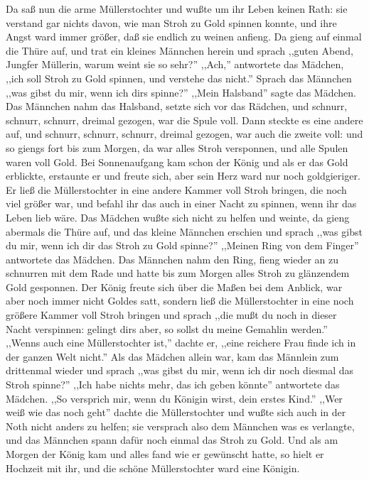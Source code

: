 \documentclass[10pt,a4paper]{article}
\begin{document}
\vskip 4pt
Da saß nun die arme Müllerstochter und wußte um ihr Leben keinen Rath: sie
verstand gar nichts davon, wie man Stroh zu Gold spinnen konnte, und ihre Angst
ward immer größer, daß sie endlich zu weinen anfieng. Da gieng auf einmal die
Thüre auf, und trat ein kleines Männchen herein und sprach ,,guten Abend,
Jungfer Müllerin, warum weint sie so sehr?'' ,,Ach,'' antwortete das Mädchen,
,,ich soll Stroh zu Gold spinnen, und verstehe das nicht.'' Sprach das Männchen
,,was gibst du mir, wenn ich dirs spinne?'' ,,Mein Halsband'' sagte das Mädchen.
Das Männchen nahm das Halsband, setzte sich vor das Rädchen, und schnurr,
schnurr, schnurr, dreimal gezogen, war die Spule voll. Dann steckte es eine
andere auf, und schnurr, schnurr, schnurr, dreimal gezogen, war auch die zweite
voll: und so giengs fort bis zum Morgen, da war alles Stroh versponnen, und alle
Spulen waren voll Gold. Bei Sonnenaufgang kam schon der König und als er das
Gold erblickte, erstaunte er und freute sich, aber sein Herz ward nur noch
goldgieriger. Er ließ die Müllerstochter in eine andere Kammer voll Stroh
bringen, die noch viel größer war, und befahl ihr das auch in einer Nacht zu
spinnen, wenn ihr das Leben lieb wäre. Das Mädchen wußte sich nicht zu helfen
und weinte, da gieng abermals die Thüre auf, und das kleine Männchen erschien
und sprach ,,was gibst du mir, wenn ich dir das Stroh zu Gold spinne?'' ,,Meinen
Ring von dem Finger'' antwortete das Mädchen. Das Männchen nahm den Ring, fieng
wieder an zu schnurren mit dem Rade und hatte bis zum Morgen alles Stroh zu
glänzendem Gold gesponnen. Der König freute sich über die Maßen bei dem Anblick,
war aber noch immer nicht Goldes satt, sondern ließ die Müllerstochter in eine
noch größere Kammer voll Stroh bringen und sprach ,,die mußt du noch in dieser
Nacht verspinnen: gelingt dirs aber, so sollst du meine Gemahlin werden.''
,,Wenns auch eine Müllerstochter ist,'' dachte er, ,,eine reichere Frau finde
ich in der ganzen Welt nicht.'' Als das Mädchen allein war, kam das Männlein
zum drittenmal wieder und sprach ,,was gibst du mir, wenn ich dir noch diesmal
das Stroh spinne?'' ,,Ich habe nichts mehr, das ich geben könnte'' antwortete
das Mädchen. ,,So versprich mir, wenn du Königin wirst, dein erstes Kind.''
,,Wer weiß wie das noch geht'' dachte die Müllerstochter und wußte sich auch in
der Noth nicht anders zu helfen; sie versprach also dem Männchen was es
verlangte, und das Männchen spann dafür noch einmal das Stroh zu Gold. Und als
am Morgen der König kam und alles fand wie er gewünscht hatte, so hielt er
Hochzeit mit ihr, und die schöne Müllerstochter ward eine Königin.
\end{document}
